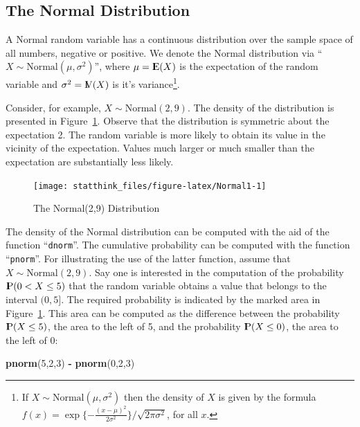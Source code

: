\documentclass[]{krantz}
\makeatletter
\newenvironment{Shaded}{\begin{snugshade}}{\end{snugshade}}
\newcommand{\DecValTok}[1]{\textcolor[rgb]{0.00,0.00,0.81}{#1}}
\newcommand{\KeywordTok}[1]{\textcolor[rgb]{0.13,0.29,0.53}{\textbf{#1}}}
\newcommand{\NormalTok}[1]{#1}
\newcommand{\OperatorTok}[1]{\textcolor[rgb]{0.81,0.36,0.00}{\textbf{#1}}}
\newcommand{\StringTok}[1]{\textcolor[rgb]{0.31,0.60,0.02}{#1}}
\newcommand{\Expec}{{\rm I\kern-.3em E}}
\newcommand{\Prob}{{\rm I\kern-.3em P}}
\newcommand{\Var}{{\rm I\kern-.3em V}}
\newenvironment{kframe}{%
\medskip{}
\setlength{\fboxsep}{.8em}
 \def\at@end@of@kframe{}%
 \ifinner\ifhmode%
  \def\at@end@of@kframe{\end{minipage}}%
  \begin{minipage}{\columnwidth}%
 \fi\fi%
 \def\FrameCommand##1{\hskip\@totalleftmargin \hskip-\fboxsep
 \colorbox{shadecolor}{##1}\hskip-\fboxsep
     \hskip-\linewidth \hskip-\@totalleftmargin \hskip\columnwidth}%
 \MakeFramed {\advance\hsize-\width
   \@totalleftmargin\z@ \linewidth\hsize
   \@setminipage}}%
 {\par\unskip\endMakeFramed%
 \at@end@of@kframe}
\renewenvironment{Shaded}{\begin{kframe}}{\end{kframe}}
\theoremstyle{definition}
\theoremstyle{definition}
\theoremstyle{definition}
\theoremstyle{remark}
\makeatother
\begin{document}
\hypertarget{the-normal-distribution}{%
\subsection{The Normal Distribution}\label{the-normal-distribution}}

A Normal random variable has a continuous distribution over the sample
space of all numbers, negative or positive. We denote the Normal
distribution via ``\(X \sim \mathrm{Normal}(\mu, \sigma^2)\)'', where
\(\mu = \Expec(X)\) is the expectation of the random variable and
\(\sigma^2 = \Var(X)\) is it's variance\footnote{If \(X \sim \mbox{Normal}(\mu,\sigma^2)\) then the density of \(X\) is
  given by the formula
  \(f(x) = \exp\{-\frac{(x-\mu)^2}{2 \sigma^2}\}/\sqrt{2 \pi \sigma^2}\),
  for all \(x\).}.

Consider, for example, \(X \sim \mathrm{Normal}(2,9)\). The density of the
distribution is presented in Figure~\ref{fig:Normal1}. Observe that the
distribution is symmetric about the expectation 2. The random variable
is more likely to obtain its value in the vicinity of the expectation.
Values much larger or much smaller than the expectation are
substantially less likely.

\begin{figure}

{\centering \texttt{[image: statthink\_files/figure-latex/Normal1-1]} 

}

\caption{The Normal(2,9) Distribution}\label{fig:Normal1}
\end{figure}

The density of the Normal distribution can be computed with the aid of
the function ``\texttt{dnorm}''. The cumulative probability can be computed with
the function ``\texttt{pnorm}''. For illustrating the use of the latter function,
assume that \(X \sim \mathrm{Normal}(2,9)\). Say one is interested in the
computation of the probability \(\Prob(0 < X \leq 5)\) that the random
variable obtains a value that belongs to the interval \((0,5]\). The
required probability is indicated by the marked area in
Figure~\ref{fig:Normal1}. This area can be computed as the difference
between the probability \(\Prob(X \leq 5)\), the area to the left of 5,
and the probability \(\Prob(X \leq 0)\), the area to the left of 0:

\begin{Shaded}
\begin{Highlighting}[]
\KeywordTok{pnorm}\NormalTok{(}\DecValTok{5}\NormalTok{,}\DecValTok{2}\NormalTok{,}\DecValTok{3}\NormalTok{) }\OperatorTok{-}\StringTok{ }\KeywordTok{pnorm}\NormalTok{(}\DecValTok{0}\NormalTok{,}\DecValTok{2}\NormalTok{,}\DecValTok{3}\NormalTok{)}
\end{Highlighting}
\end{Shaded}
\end{document}
